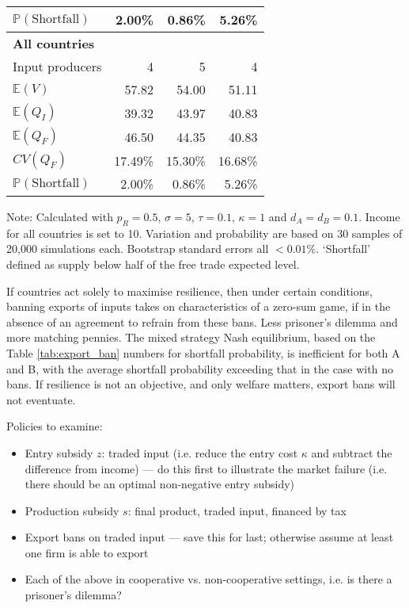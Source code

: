 \documentclass{article}
\begin{document}
\begin{table}
\begin{threeparttable}
\begin{tabular}{lrrr}
            $\mathbb{P}(\text{Shortfall})$ & 2.00\% & 0.86\% & 5.26\% \\ 
            \midrule
            \textbf{All countries} \\
            Input producers & 4 & 5 & 4 \\
            $\mathbb{E}(V)$ & 57.82 & 54.00 & 51.11 \\
            $\mathbb{E}(Q_I)$ & 39.32 & 43.97 & 40.83 \\
            $\mathbb{E}(Q_F)$ & 46.50 & 44.35 & 40.83 \\
            $CV(Q_F)$ & 17.49\% & 15.30\% & 16.68\% \\
            $\mathbb{P}(\text{Shortfall})$ & 2.00\% & 0.86\% & 5.26\% \\ 
            \bottomrule
        \end{tabular}
        \begin{tablenotes}
            \small \item Note: Calculated with $p_R = 0.5$, $\sigma = 5$, $\tau = 0.1$, $\kappa = 1$ and $d_A = d_B = 0.1$. Income for all countries is set to 10. Variation and probability are based on 30 samples of 20,000 simulations each. Bootstrap standard errors all $<0.01\%$. `Shortfall' defined as supply below half of the free trade expected level. 
        \end{tablenotes}
    \end{threeparttable}
\end{table}

If countries act solely to maximise resilience, then under certain conditions, banning exports of inputs takes on characteristics of a zero-sum game, if in the absence of an agreement to refrain from these bans. Less prisoner's dilemma and more matching pennies. The mixed strategy Nash equilibrium, based on the Table \ref{tab:export_ban} numbers for shortfall probability, is inefficient for both A and B, with the average shortfall probability exceeding that in the case with no bans. If resilience is not an objective, and only welfare matters, export bans will not eventuate.

Policies to examine:
\begin{itemize}
    \item Entry subsidy $z$: traded input (i.e. reduce the entry cost $\kappa$ and subtract the difference from income) --- do this first to illustrate the market failure (i.e. there should be an optimal non-negative entry subsidy) 
    \item Production subsidy $s$: final product, traded input, financed by tax 
    \item Export bans on traded input --- save this for last; otherwise assume at least one firm is able to export 
    \item Each of the above in cooperative vs. non-cooperative settings, i.e. is there a prisoner's dilemma? 
\end{itemize}
\end{document}
